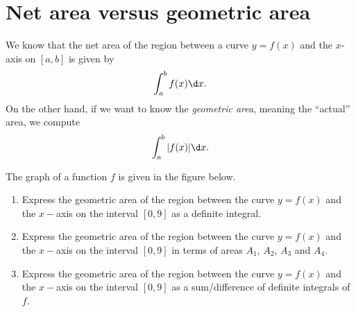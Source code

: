 \documentclass{ximera}
\begin{document}
\section{Net area versus geometric area}


We know that the net area of the region between a curve $y=f(x)$ and the $x$-axis
on $[a,b]$ is given by
\[
\int_a^b f(x) \d x.
\]
On the other hand, if we want to know the \textit{geometric area},
meaning the ``actual'' area, we compute
\[
\int_a^b |f(x)| \d x.
\]
\begin{example}
The graph of a function $f$ is given in the figure below.
 \begin{image}
\end{image}
\begin{enumerate}
\item Express the  geometric  area of the region between the curve $y=f(x)$ and the $x-$axis on the interval $[0,9]$ as a definite integral.
\item Express the  geometric  area of the region between the curve $y=f(x)$ and the $x-$axis on the interval $[0,9]$ in terms of areas $A_1$, $A_2$, $A_3$ and $A_4$.
\item Express the  geometric  area of the region between the curve $y=f(x)$ and the $x-$axis on the interval $[0,9]$ as a sum/difference of  definite integrals of $f$.

\end{enumerate}
\end{example}
\end{document}
